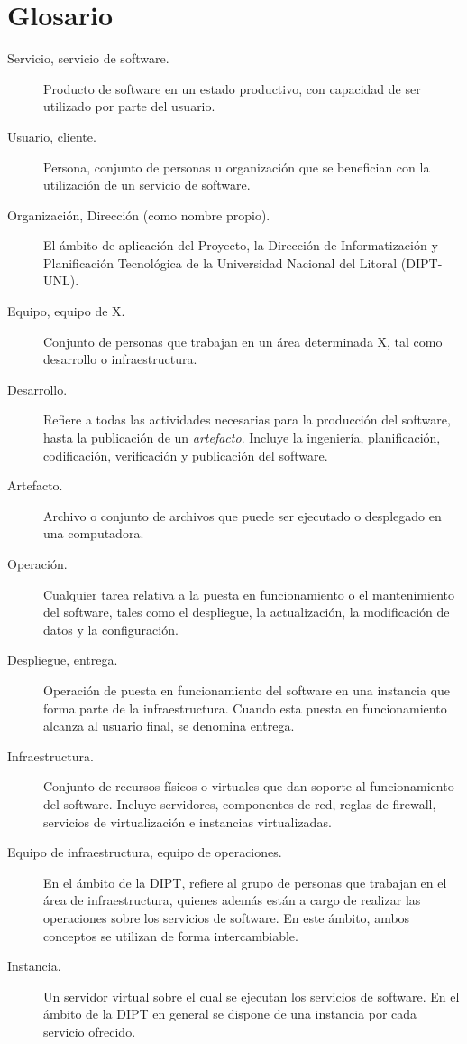 %
%
%
\chapter*{Glosario}
%
{
\begin{description}
  \item[Servicio, servicio de software.] Producto de software en un
  estado productivo, con capacidad de ser utilizado por parte del
  usuario.
%
  \item[Usuario, cliente.] Persona, conjunto de personas u
  organización que se benefician con la utilización de un servicio de
  software.
%
  \item[Organización, Dirección (como nombre propio).] El ámbito de
  aplicación del Proyecto, la Dirección de Informatización y
  Planificación Tecnológica de la Universidad Nacional del Litoral
  (DIPT-UNL).
%
  \item[Equipo, equipo de X.] Conjunto de personas que trabajan en un
  área determinada X, tal como desarrollo o infraestructura.
%
  \item[Desarrollo.] Refiere a todas las actividades necesarias para
  la producción del software, hasta la publicación de un
  \textit{artefacto}. Incluye la ingeniería, planificación,
  codificación, verificación y publicación del software.
%
  \item[Artefacto.] Archivo o conjunto de archivos que puede ser
  ejecutado o desplegado en una computadora.
%
  \item[Operación.] Cualquier tarea relativa a la puesta en
  funcionamiento o el mantenimiento del software, tales como el
  despliegue, la actualización, la modificación de datos y la
  configuración.
%
  \item[Despliegue, entrega.] Operación de puesta en funcionamiento
  del software en una instancia que forma parte de la
  infraestructura. Cuando esta puesta en funcionamiento alcanza al
  usuario final, se denomina entrega.
%
  \item[Infraestructura.] Conjunto de recursos físicos o virtuales que
  dan soporte al funcionamiento del software. Incluye servidores,
  componentes de red, reglas de firewall, servicios de virtualización e
  instancias virtualizadas.
%
  \item[Equipo de infraestructura, equipo de operaciones.] En el
  ámbito de la DIPT, refiere al grupo de personas que trabajan en el
  área de infraestructura, quienes además están a cargo de realizar las
  operaciones sobre los servicios de software. En este ámbito, ambos
  conceptos se utilizan de forma intercambiable.
%
  \item[Instancia.] Un servidor virtual sobre el cual se ejecutan los
  servicios de software. En el ámbito de la DIPT en general se dispone
  de una instancia por cada servicio ofrecido.
\end{description}
}
